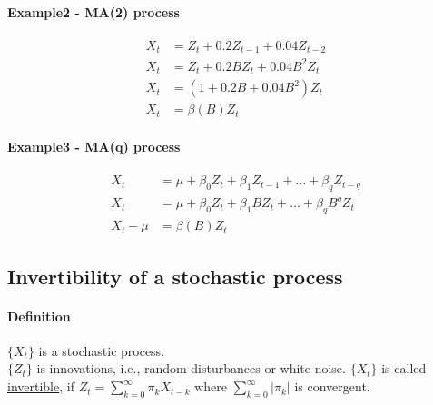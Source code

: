\documentclass[11pt]{article}
\newcommand{\under}[1]{\underline{#1}}
\begin{document}
\paragraph{Example2 - MA(2) process}
\begin{align*}
	X_t &= Z_t + 0.2Z_{t-1} + 0.04Z_{t-2} \\
	X_t &= Z_t + 0.2BZ_t + 0.04B^2Z_t \\
	X_t &= (1 + 0.2B + 0.04 B^2) Z_t \\
	X_t &= \beta(B) Z_t  \tag{$\beta(B) = 1 + 0.2B + 0.04 B^2$}
\end{align*}

\paragraph{Example3 - MA(q) process}
\begin{align*}
	X_t &= \mu + \beta_0Z_t + \beta_1Z_{t-1} + \hdots + \beta_q Z_{t-q} \\
	X_t &= \mu + \beta_0Z_t + \beta_1BZ_t + \hdots + \beta_q B^qZ_t \\
	X_t - \mu &= \beta(B)Z_t \tag{$\beta(B) = \phi_0 + \phi_1B + \hdots + \phi_qB^q$}
\end{align*}

\subsection{Invertibility of a stochastic process}
\paragraph{Definition}
$\{X_t\}$ is a stochastic process. \\
$\{Z_t\}$ is innovations, i.e., random disturbances or white noise.
$\{X_t\}$ is called \under{invertible}, if $Z_t = \sum_{k=0}^\infty \pi_k X_{t-k}$ where $\sum_{k=0}^\infty |\pi_k|$ is convergent.
\end{document}
